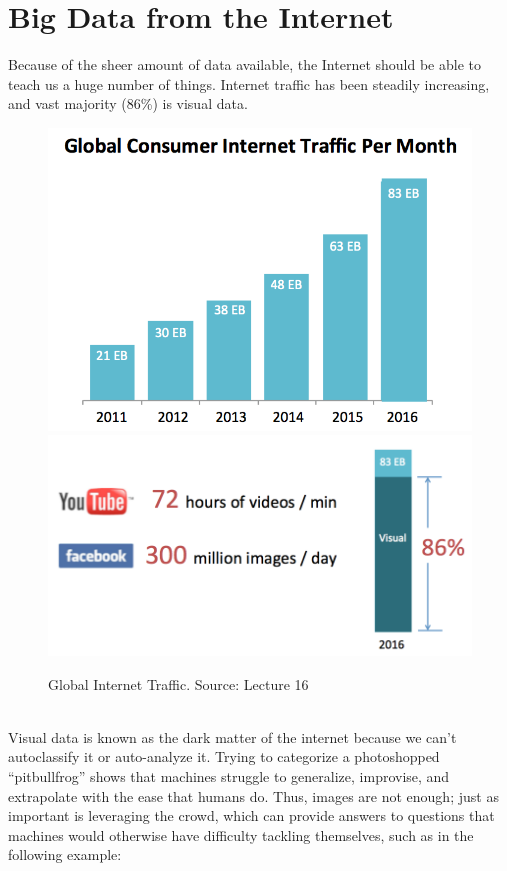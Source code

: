 \documentclass[11pt]{article}
\begin{document}
\section{Big Data from the Internet}
Because of the sheer amount of data available, the Internet should be able to teach us a huge number of things. Internet traffic has been steadily increasing, and vast majority (86\%) is visual data. \\
\begin{figure}[h]
  \centering
  \includegraphics[scale=0.6]{internettraffic.png}\includegraphics[scale=0.6]{fbyoutubedata.png}
  \caption{ Global Internet Traffic. Source: Lecture 16}
\end{figure}\\
Visual data is known as the dark matter of the internet because we can't autoclassify it or auto-analyze it. Trying to categorize a photoshopped ``pitbullfrog'' shows that machines struggle to generalize, improvise, and extrapolate with the ease that humans do. Thus, images are not enough; just as important is leveraging the crowd, which can provide answers to questions that machines would otherwise have difficulty tackling themselves, such as in the following example:\\
\end{document}
